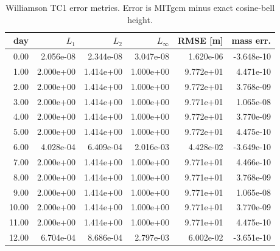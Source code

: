 \begin{table}[htbp]
\centering
{}
\begin{tabular}{rrrrrr}
\toprule
\rowcolor{gray!25}
day & $L_1$ & $L_2$ & $L_\infty$ & RMSE [m] & mass err. \\ 
\midrule
0.00 & 2.056e-08 & 2.344e-08 & 3.047e-08 & 1.620e-06 & -3.648e-10 \\ 
1.00 & 2.000e+00 & 1.414e+00 & 1.000e+00 & 9.772e+01 & 4.471e-10 \\ 
2.00 & 2.000e+00 & 1.414e+00 & 1.000e+00 & 9.772e+01 & 3.768e-09 \\ 
3.00 & 2.000e+00 & 1.414e+00 & 1.000e+00 & 9.771e+01 & 1.065e-08 \\ 
4.00 & 2.000e+00 & 1.414e+00 & 1.000e+00 & 9.772e+01 & 3.770e-09 \\ 
5.00 & 2.000e+00 & 1.414e+00 & 1.000e+00 & 9.772e+01 & 4.475e-10 \\ 
6.00 & 4.028e-04 & 6.409e-04 & 2.016e-03 & 4.428e-02 & -3.649e-10 \\ 
7.00 & 2.000e+00 & 1.414e+00 & 1.000e+00 & 9.771e+01 & 4.466e-10 \\ 
8.00 & 2.000e+00 & 1.414e+00 & 1.000e+00 & 9.771e+01 & 3.768e-09 \\ 
9.00 & 2.000e+00 & 1.414e+00 & 1.000e+00 & 9.771e+01 & 1.065e-08 \\ 
10.00 & 2.000e+00 & 1.414e+00 & 1.000e+00 & 9.771e+01 & 3.770e-09 \\ 
11.00 & 2.000e+00 & 1.414e+00 & 1.000e+00 & 9.771e+01 & 4.475e-10 \\ 
12.00 & 6.704e-04 & 8.686e-04 & 2.797e-03 & 6.002e-02 & -3.651e-10 \\ 
\bottomrule
\end{tabular}
\caption{Williamson TC1 error metrics. Error is MITgcm minus exact cosine-bell height.}
\end{table}
